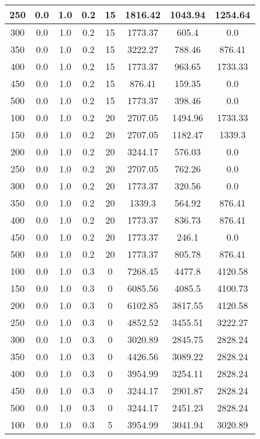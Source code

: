 \documentclass[a4paper, 12pt]{extreport}
\begin{document}
\begin{itemize}
\begin{longtable}{|c|c|c|c|c|c|c|c|}
			250 & 0.0 & 1.0 & 0.2 & 15 & 1816.42 & 1043.94 & 1254.64 \\\hline
			300 & 0.0 & 1.0 & 0.2 & 15 & 1773.37 & 605.4 & 0.0 \\\hline
			350 & 0.0 & 1.0 & 0.2 & 15 & 3222.27 & 788.46 & 876.41 \\\hline
			400 & 0.0 & 1.0 & 0.2 & 15 & 1773.37 & 963.65 & 1733.33 \\\hline
			450 & 0.0 & 1.0 & 0.2 & 15 & 876.41 & 159.35 & 0.0 \\\hline
			500 & 0.0 & 1.0 & 0.2 & 15 & 1773.37 & 398.46 & 0.0 \\\hline
			100 & 0.0 & 1.0 & 0.2 & 20 & 2707.05 & 1494.96 & 1733.33 \\\hline
			150 & 0.0 & 1.0 & 0.2 & 20 & 2707.05 & 1182.47 & 1339.3 \\\hline
			200 & 0.0 & 1.0 & 0.2 & 20 & 3244.17 & 576.03 & 0.0 \\\hline
			250 & 0.0 & 1.0 & 0.2 & 20 & 2707.05 & 762.26 & 0.0 \\\hline
			300 & 0.0 & 1.0 & 0.2 & 20 & 1773.37 & 320.56 & 0.0 \\\hline
			350 & 0.0 & 1.0 & 0.2 & 20 & 1339.3 & 564.92 & 876.41 \\\hline
			400 & 0.0 & 1.0 & 0.2 & 20 & 1773.37 & 836.73 & 876.41 \\\hline
			450 & 0.0 & 1.0 & 0.2 & 20 & 1773.37 & 246.1 & 0.0 \\\hline
			500 & 0.0 & 1.0 & 0.2 & 20 & 1773.37 & 805.78 & 876.41 \\\hline
			100 & 0.0 & 1.0 & 0.3 & 0 & 7268.45 & 4477.8 & 4120.58 \\\hline
			150 & 0.0 & 1.0 & 0.3 & 0 & 6085.56 & 4085.5 & 4100.73 \\\hline
			200 & 0.0 & 1.0 & 0.3 & 0 & 6102.85 & 3817.55 & 4120.58 \\\hline
			250 & 0.0 & 1.0 & 0.3 & 0 & 4852.52 & 3455.51 & 3222.27 \\\hline
			300 & 0.0 & 1.0 & 0.3 & 0 & 3020.89 & 2845.75 & 2828.24 \\\hline
			350 & 0.0 & 1.0 & 0.3 & 0 & 4426.56 & 3089.22 & 2828.24 \\\hline
			400 & 0.0 & 1.0 & 0.3 & 0 & 3954.99 & 3254.11 & 2828.24 \\\hline
			450 & 0.0 & 1.0 & 0.3 & 0 & 3244.17 & 2901.87 & 2828.24 \\\hline
			500 & 0.0 & 1.0 & 0.3 & 0 & 3244.17 & 2451.23 & 2828.24 \\\hline
			100 & 0.0 & 1.0 & 0.3 & 5 & 3954.99 & 3041.94 & 3020.89 \\\hline

\end{longtable}
\end{itemize}
\end{document}
